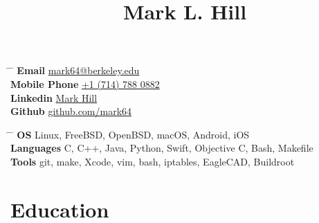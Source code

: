 \documentclass[10pt]{article} %
\begin{document}

\title{Mark L. Hill} %


\parbox{0.5\textwidth}{ %
\begin{tabbing} %
\hspace{3cm} \= \hspace{4cm} \= \kill %
{\bf Email} \> \href{mailto:mark64@berkeley.edu}{mark64@berkeley.edu} \\ %
{\bf Mobile Phone} \> \href{tel:+17147880882}{+1 (714) 788 0882} \\ %
{\bf Linkedin} \> \href{https://www.linkedin.com/in/mark-h-6ab768146}{Mark Hill} \\ %
{\bf Github} \> \href{https://github.com/mark64} {github.com/mark64} %
\end{tabbing}}
\hfill %
\parbox{0.5\textwidth}{ %
\begin{tabbing} %
\hspace{3cm} \= \hspace{4cm} \= \kill %
{\bf OS} \> Linux, FreeBSD, OpenBSD, macOS, Android, iOS \\
{\bf Languages} \> C, C++, Java, Python, Swift, Objective C, Bash, Makefile \\
{\bf Tools} \> git, make, Xcode, vim, bash, iptables, EagleCAD, Buildroot \\
\end{tabbing}}



\section{Education}

\end{document}
